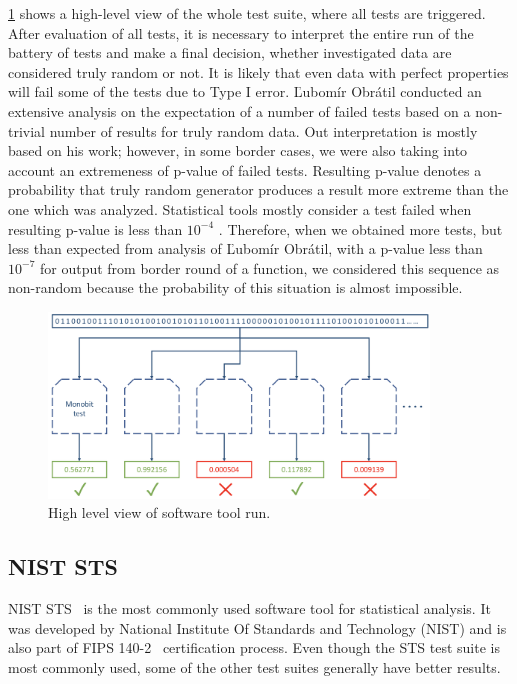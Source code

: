 \documentclass[
    digital,    %
    oneside,    %
    color,
    11pt,
    nocover,
    notable,
    nolof,
    nolot,
    final
]{fithesis3}
\renewcommand\_{\textunderscore\allowbreak}
\begin{document}
\cref{fig:whole-suite} shows a high-level view of the whole test suite, where all tests are triggered. After evaluation of all tests, it is necessary to interpret the entire run of the battery of tests and make a final decision, whether investigated data are considered truly random or not. It is likely that even data with perfect properties will fail some of the tests due to Type I error. Ľubomír Obrátil conducted \cite{Obratil2017thesis} an extensive analysis on the expectation of a number of failed tests based on a non-trivial number of results for truly random data. Out interpretation is mostly based on his work; however, in some border cases, we were also taking into account an extremeness of p-value of failed tests. Resulting p-value denotes a probability that truly random generator produces a result more extreme than the one which was analyzed. Statistical tools mostly consider a test failed when resulting p-value is less than $ 10^{-4}  $ \cite{nist-explanation,dieharder}. Therefore, when we obtained more tests, but less than expected from analysis of Ľubomír Obrátil, with a p-value less than $10^{-7}$ for output from border round of a function, we considered this sequence as non-random because the probability of this situation is almost impossible.

\begin{figure}[h]
	\centering
	\includegraphics[width=0.9\textwidth]{./images/pictures/software-tool.png}
	\caption{High level view of software tool run.}
	\label{fig:whole-suite}
\end{figure}

\subsection{NIST STS}
{NIST STS}~\cite{nist-sts} is the most commonly used software tool for statistical analysis. It was developed by National Institute Of Standards and Technology (NIST) and is also part of FIPS 140-2~\cite{NIST140-2} certification process. Even though the STS test suite is most commonly used, some of the other test suites generally have better results.
\end{document}
